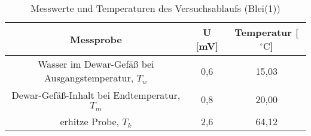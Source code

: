 \begin{table}[h]
	\begin{center}
		\begin{tabular}{ccc}
			Messprobe & U [mV] & Temperatur [$^{\circ}\mathrm{C}$]\\ \hline
			Wasser im Dewar-Gefäß bei Ausgangstemperatur, $T_w$&0,6&15,03\\
			Dewar-Gefäß-Inhalt bei Endtemperatur, $T_m$&0,8&20,00\\
			erhitze Probe, $T_k$&2,6&64,12
		\end{tabular}
		\caption{Messwerte und Temperaturen des Versuchsablaufs (Blei(1))}
		\label{tabblei1}
	\end{center}
\end{table}